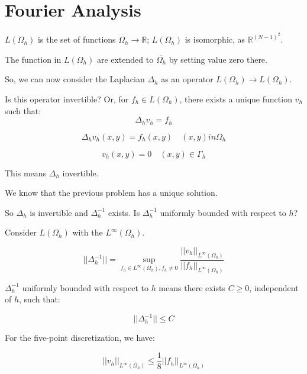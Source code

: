\section{Fourier Analysis}

$L(\Omega_h)$ is the set of functions $\Omega_h \rightarrow \mathbb{R}$; $L(\Omega_h)$ is isomorphic, as $\mathbb{R}^{(N-1)^2}$.

The function in $L(\Omega_h)$ are extended to $\overline{\Omega_h}$ by setting value zero there.

So, we can now consider the Laplacian $\Delta_h$ as an operator $L(\Omega_h) \rightarrow L(\Omega_h)$.

Is this operator invertible? Or, for $f_h \in L(\Omega_h)$, there exists a unique function $v_h$ such that:
\begin{equation*}
\Delta_h v_h = f_h
\end{equation*}

\begin{equation}
\Delta_h v_h(x, y) = f_h(x, y)  \quad (x, y) in \Omega_h
\end{equation}

\begin{equation}
v_h(x, y) = 0 \quad (x, y) \in \Gamma_h
\end{equation}

This means $\Delta_h$ invertible.

We know that the previous problem has a unique solution.

So $\Delta_h$ is invertible and $\Delta_h^{-1}$ exists.
Is $\Delta_h^{-1}$ uniformly bounded with respect to $h$?

Consider $L(\Omega_h)$ with the $L^\infty(\Omega_h)$.

\begin{equation*}
|| \Delta_h^{-1} || = \sup_{f_h \in L^{\infty}(\Omega_h), f_h \neq 0} \frac{||v_h||_{L^{\infty}(\Omega_h)}}{||f_h||_{L^{\infty}(\Omega_h)}}
\end{equation*}

$\Delta_h^{-1}$ uniformly bounded with respect to $h$ means there exists $C \ge 0$, independent of $h$, such that:

\begin{equation*}
|| \Delta_h^{-1} || \le C
\end{equation*}

For the five-point discretization, we have:

\begin{equation*}
||v_h||_{L^{\infty}(\Omega_h)} \le \frac{1}{8} ||f_h||_{L^{\infty}(\Omega_h)}
\end{equation*}

